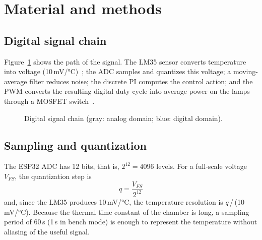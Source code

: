\section{Material and methods}

\subsection{Digital signal chain}
Figure~\ref{fig:chain} shows the path of the signal. The LM35 sensor converts temperature into
voltage (10\,mV/°C)~\cite{lm35}; the ADC samples and quantizes this voltage; a moving-average filter
reduces noise; the discrete PI computes the control action; and the PWM converts the resulting
digital duty cycle into average power on the lamps through a MOSFET switch~\cite{irlz44n}.

\begin{figure}[htb]
  \centering
  \caption{Digital signal chain (gray: analog domain; blue: digital domain).}
  \label{fig:chain}
\end{figure}

\subsection{Sampling and quantization}
The ESP32 ADC has 12 bits, that is, $2^{12} = 4096$ levels. For a full-scale voltage $V_{FS}$, the
quantization step is
\begin{equation}
  q = \frac{V_{FS}}{2^{12}}
  \label{eq:lsb}
\end{equation}
and, since the LM35 produces 10\,mV/°C, the temperature resolution is $q$\,/\,(10\,mV/°C).
Because the thermal time constant of the chamber is long, a sampling period of 60\,s (1\,s in bench
mode) is enough to represent the temperature without aliasing of the useful signal.

